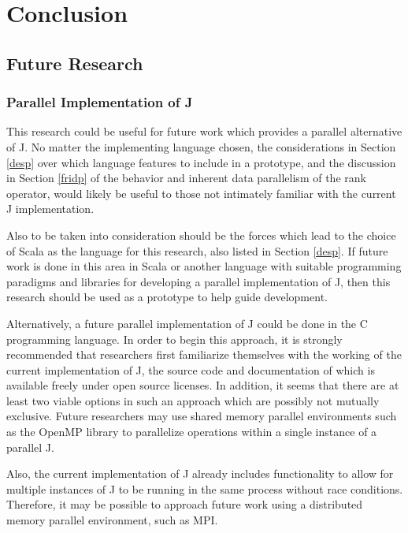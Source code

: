 \chapter{Conclusion}
\label{conc}

\section{Future Research}

\subsection{Parallel Implementation of J}
This research could be useful for future work which provides 
a parallel alternative of J.
No matter the implementing language chosen, 
the considerations in Section \ref{desp} 
over which language features to include in a prototype, 
and the discussion in Section \ref{fridp} of the behavior and inherent data parallelism of the rank operator, 
would likely be useful to those not intimately familiar with the current J implementation.

Also to be taken into consideration should be 
the forces which lead to the choice of Scala as the language 
for this research, also listed in Section \ref{desp}. 
If future work is done in this area in Scala 
or another language with suitable programming paradigms and libraries 
for developing a parallel implementation of J, 
then this research should be used as a prototype 
to help guide development.

Alternatively, a future parallel implementation of J
could be done in the C programming language. 
In order to begin this approach, 
it is strongly recommended that researchers first 
familiarize themselves with the working of the current implementation of J\cite{ioj}, 
the source code and documentation of which 
is available freely under open source licenses.
In addition, it seems that there are at least two viable options in such an approach 
which are possibly not mutually exclusive.
Future researchers may use shared memory parallel environments
such as the OpenMP library 
to parallelize operations within a single instance of a parallel J.

Also, the current implementation of J already includes 
functionality to allow for multiple instances of J to be running in the same process 
without race conditions.
Therefore, it may be possible to approach future work using 
a distributed memory parallel environment, such as MPI. %

